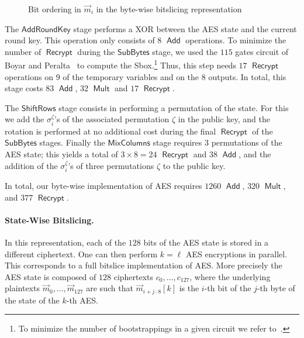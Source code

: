 \documentclass[11pt]{llncs}
\DeclareMathOperator{\Recrypt}{\ensuremath{\mathsf{Recrypt}}}
\DeclareMathOperator{\Add}{\ensuremath{\mathsf{Add}}}
\DeclareMathOperator{\Mult}{\ensuremath{\mathsf{Mult}}}
\newcommand*\AddRoundKey{\ensuremath{\mathsf{AddRoundKey}}}
\newcommand*\ShiftRows{\ensuremath{\mathsf{ShiftRows}}}
\newcommand*\SubBytes{\ensuremath{\mathsf{SubBytes}}}
\newcommand*\MixColumns{\ensuremath{\mathsf{MixColumns}}}
\newcommand*\bwbs{byte-wise bitslicing\xspace}
\begin{document}
\begin{figure}[bt]
  \caption{Bit ordering in $\vec m_i$ in the \bwbs{} representation}
  \label{fig:bwbs-state}
\end{figure}

The $\AddRoundKey$ stage performs a XOR between the AES state and the
current round key. This operation only consists of $8$ $\Add$
operations.  
To minimize the
number of $\Recrypt$ during the $\SubBytes$ stage, we used the $115$ gates circuit of
Boyar and Peralta~\cite{BP2010} to compute the Sbox.\footnote{To minimize the number of bootstrappings in a given circuit we refer to~\cite{LP2013}.} 
Thus, this step needs $17$
$\Recrypt$ operations
on $9$ of
the temporary variables and on the $8$ outputs. In total, this stage
costs $83$ $\Add$, $32$ $\Mult$ and $17$
$\Recrypt$.

The $\ShiftRows$ stage consists in performing a permutation of the
state. For this we add the $\sigma^\zeta_i$'s of the associated
permutation $\zeta$ in the public key, and the rotation is performed 
at no additional cost during the final $\Recrypt$ of the $\SubBytes$
stages. 
Finally the $\MixColumns$ stage requires $3$ permutations of the AES
state; this yields a total of $3\times 8=24$ $\Recrypt$
and $38$ $\Add$, and the addition of the $\sigma^\zeta_i$'s of
three permutations $\zeta$ to the public key. 

In total, our byte-wise implementation of AES requires  $1260$ $\Add$,
 $320$ $\Mult$, and $377$ $\Recrypt$.

\paragraph{State-Wise Bitslicing.} In this representation, each of the
$128$ bits of the AES state is stored in a different ciphertext. One
can then perform $k=\ell$ AES encryptions in parallel. This
corresponds to a full bitslice implementation of AES.
More precisely
the AES state is composed of $128$ ciphertexts $c_0,\ldots,c_{127}$,
where the underlying plaintexts $\vec m_0,\ldots,\vec m_{127}$ are
such that $\vec m_{i+j\cdot 8}[k]$ is the $i$-th bit of the $j$-th
byte of the state of the $k$-th AES.
\end{document}
